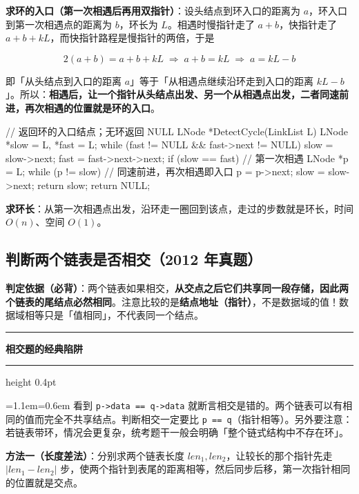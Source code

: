 \documentclass[11pt,openany,UTF8]{ctexbook}
\newcommand{\callouthead}[2]{%
  \par\addvspace{7pt}\noindent
  {\color{#1}\rule[-0.15em]{3pt}{1.05em}}\hspace{0.5em}%
  {\bfseries\color{#1}#2}\par\nobreak\vspace{-0.35em}%
  {\color{rulesep}\hrule height 0.4pt}\nobreak\vspace{0.45em}%
  \begingroup\small\setlength{\parindent}{0pt}%
  \leftskip=1.1em\rightskip=0.6em\noindent\ignorespaces}
\newcommand{\calloutend}{\par\endgroup\addvspace{7pt}}
\newenvironment{callwarn}[1]{\callouthead{warnbar}{#1}}{\calloutend}
\begin{document}
\textbf{求环的入口（第一次相遇后再用双指针）}：设头结点到环入口的距离为 $a$，环入口到第一次相遇点的距离为 $b$，环长为 $L$。相遇时慢指针走了 $a+b$，快指针走了 $a+b+kL$，而快指针路程是慢指针的两倍，于是

\[2(a+b) = a + b + kL \;\Longrightarrow\; a + b = kL \;\Longrightarrow\; a = kL - b\]

即「从头结点到入口的距离 $a$」等于「从相遇点继续沿环走到入口的距离 $kL-b$」。所以：\textbf{相遇后，让一个指针从头结点出发、另一个从相遇点出发，二者同速前进，再次相遇的位置就是环的入口}。

\begin{codebox}
// 返回环的入口结点；无环返回 NULL
LNode *DetectCycle(LinkList L) {
    LNode *slow = L, *fast = L;
    while (fast != NULL && fast->next != NULL) {
        slow = slow->next;
        fast = fast->next->next;
        if (slow == fast) {              // 第一次相遇
            LNode *p = L;
            while (p != slow) {          // 同速前进，再次相遇即入口
                p = p->next;
                slow = slow->next;
            }
            return slow;
        }
    }
    return NULL;
}
\end{codebox}

\textbf{求环长}：从第一次相遇点出发，沿环走一圈回到该点，走过的步数就是环长，时间 $O(n)$、空间 $O(1)$。

\subsection{判断两个链表是否相交（2012 年真题）}

\textbf{判定依据（必背）}：两个链表如果相交，\textbf{从交点之后它们共享同一段存储，因此两个链表的尾结点必然相同}。注意比较的是\textbf{结点地址（指针）}，不是数据域的值！数据域相等只是「值相同」，不代表同一个结点。

\begin{callwarn}{相交题的经典陷阱}
看到 \texttt{p->\allowbreak{}data =\allowbreak{}=\allowbreak{} q->\allowbreak{}data} 就断言相交是错的。两个链表可以有相同的值而完全不共享结点。判断相交一定要比 \texttt{p =\allowbreak{}=\allowbreak{} q}（指针相等）。另外要注意：若链表带环，情况会更复杂，统考题干一般会明确「整个链式结构中不存在环」。

\end{callwarn}

\textbf{方法一（长度差法）}：分别求两个链表长度 $len_1, len_2$，让较长的那个指针先走 $|len_1-len_2|$ 步，使两个指针到表尾的距离相等，然后同步后移，第一次指针相同的位置就是交点。
\end{document}
